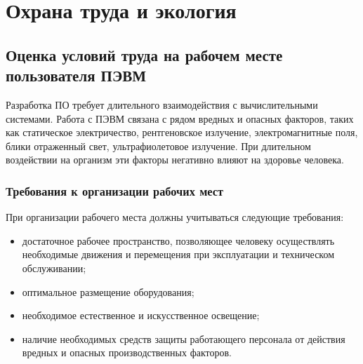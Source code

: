 \chapter{Охрана труда и экология}

\section{Оценка условий труда на рабочем месте пользователя ПЭВМ}

Разработка ПО требует длительного взаимодействия с вычислительными системами. Работа с ПЭВМ связана с рядом вредных и опасных факторов, таких как статическое электричество, рентгеновское излучение, электромагнитные поля, блики отраженный свет, ультрафиолетовое излучение. При длительном воздействии на организм эти факторы негативно влияют на здоровье человека.

\subsection{Требования к организации рабочих мест}
При организации рабочего места должны учитываться следующие требования:
\begin{itemize}
\item достаточное рабочее пространство, позволяющее человеку осуществлять необходимые движения и перемещения при эксплуатации и техническом обслуживании;

\item оптимальное размещение оборудования;
\item необходимое естественное и искусственное освещение;
\item наличие необходимых средств защиты работающего персонала от действия вредных и опасных производственных факторов.
\end{itemize}


